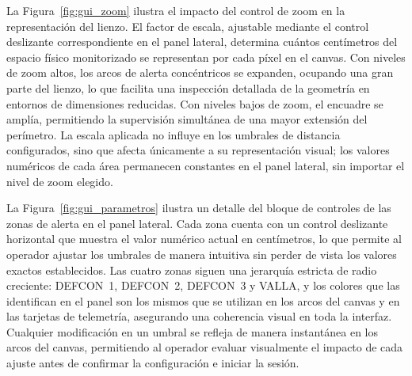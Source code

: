 La Figura~\ref{fig:gui_zoom} ilustra el impacto del control de zoom en la representación del lienzo. El factor de escala, ajustable mediante el control deslizante correspondiente en el panel lateral, determina cuántos centímetros del espacio físico monitorizado se representan por cada píxel en el canvas. Con niveles de zoom altos, los arcos de alerta concéntricos se expanden, ocupando una gran parte del lienzo, lo que facilita una inspección detallada de la geometría en entornos de dimensiones reducidas. Con niveles bajos de zoom, el encuadre se amplía, permitiendo la supervisión simultánea de una mayor extensión del perímetro. La escala aplicada no influye en los umbrales de distancia configurados, sino que afecta únicamente a su representación visual; los valores numéricos de cada área permanecen constantes en el panel lateral, sin importar el nivel de zoom elegido.


La Figura~\ref{fig:gui_parametros} ilustra un detalle del bloque de controles de las zonas de alerta en el panel lateral. Cada zona cuenta con un control deslizante horizontal que muestra el valor numérico actual en centímetros, lo que permite al operador ajustar los umbrales de manera intuitiva sin perder de vista los valores exactos establecidos. Las cuatro zonas siguen una jerarquía estricta de radio creciente: DEFCON~1, DEFCON~2, DEFCON~3 y VALLA, y los colores que las identifican en el panel son los mismos que se utilizan en los arcos del canvas y en las tarjetas de telemetría, asegurando una coherencia visual en toda la interfaz. Cualquier modificación en un umbral se refleja de manera instantánea en los arcos del canvas, permitiendo al operador evaluar visualmente el impacto de cada ajuste antes de confirmar la configuración e iniciar la sesión.


